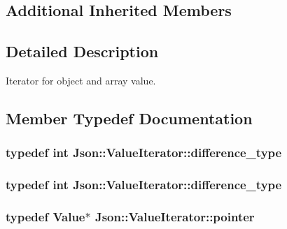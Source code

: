 \subsection*{Additional Inherited Members}


\subsection{Detailed Description}
Iterator for object and array value. 

\subsection{Member Typedef Documentation}
\hypertarget{classJson_1_1ValueIterator_a2be1a9aa60bbfc8812e9dd1a7f1a8786}{
\subsubsection[{difference\-\_\-type}]{\setlength{\rightskip}{0pt plus 5cm}typedef int {\bf Json\-::\-Value\-Iterator\-::difference\-\_\-type}}}\label{de/dd0/classJson_1_1ValueIterator_a2be1a9aa60bbfc8812e9dd1a7f1a8786}
\hypertarget{classJson_1_1ValueIterator_a2be1a9aa60bbfc8812e9dd1a7f1a8786}{
\subsubsection[{difference\-\_\-type}]{\setlength{\rightskip}{0pt plus 5cm}typedef int {\bf Json\-::\-Value\-Iterator\-::difference\-\_\-type}}}\label{de/dd0/classJson_1_1ValueIterator_a2be1a9aa60bbfc8812e9dd1a7f1a8786}
\hypertarget{classJson_1_1ValueIterator_acec45feb1ef1f3bf81240157d06d5432}{
\subsubsection[{pointer}]{\setlength{\rightskip}{0pt plus 5cm}typedef {\bf Value}$\ast$ {\bf Json\-::\-Value\-Iterator\-::pointer}}}\label{de/dd0/classJson_1_1ValueIterator_acec45feb1ef1f3bf81240157d06d5432}
